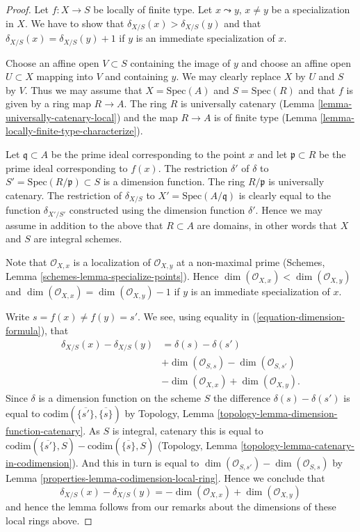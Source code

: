 \begin{proof}
Let $f : X \to S$ be locally of finite type.
Let $x \leadsto y$, $x \not = y$ be a specialization in $X$.
We have to show that $\delta_{X/S}(x) > \delta_{X/S}(y)$ and
that $\delta_{X/S}(x) = \delta_{X/S}(y) + 1$ if $y$ is an
immediate specialization of $x$.

\medskip\noindent
Choose an affine open $V \subset S$ containing the image of
$y$ and choose an affine open $U \subset X$ mapping into $V$
and containing $y$. We may clearly replace $X$ by $U$ and
$S$ by $V$. Thus we may assume that $X = \text{Spec}(A)$
and $S = \text{Spec}(R)$ and that $f$ is given by a ring
map $R \to A$. The ring $R$ is universally catenary
(Lemma \ref{lemma-universally-catenary-local})
and the map $R \to A$ is of finite type
(Lemma \ref{lemma-locally-finite-type-characterize}).

\medskip\noindent
Let $\mathfrak q \subset A$ be the prime ideal corresponding
to the point $x$ and let $\mathfrak p \subset R$ be the prime
ideal corresponding to $f(x)$. The restriction $\delta'$ of $\delta$
to $S' = \text{Spec}(R/\mathfrak p) \subset S$ is a dimension
function. The ring $R/\mathfrak p$ is universally catenary.
The restriction of $\delta_{X/S}$ to $X' = \text{Spec}(A/\mathfrak q)$
is clearly equal to the function $\delta_{X'/S'}$ constructed
using the dimension function $\delta'$. Hence we may assume
in addition to the above that $R \subset A$ are domains, in
other words that $X$ and $S$ are integral schemes.

\medskip\noindent
Note that $\mathcal{O}_{X, x}$ is a localization of
$\mathcal{O}_{X, y}$ at a non-maximal prime
(Schemes, Lemma \ref{schemes-lemma-specialize-points}).
Hence $\dim(\mathcal{O}_{X, x}) < \dim(\mathcal{O}_{X, y})$
and $\dim(\mathcal{O}_{X, x}) = \dim(\mathcal{O}_{X, y}) - 1$
if $y$ is an immediate specialization of $x$.

\medskip\noindent
Write $s = f(x) \not = f(y) = s'$. We see, using equality
in (\ref{equation-dimension-formula}), that
\begin{align*}
\delta_{X/S}(x) - \delta_{X/S}(y) & = \delta(s) - \delta(s') \\
& + \dim(\mathcal{O}_{S, s}) - \dim(\mathcal{O}_{S, s'}) \\
& - \dim(\mathcal{O}_{X, x}) + \dim(\mathcal{O}_{X, y}).
\end{align*}
Since $\delta$ is a dimension function on the scheme $S$ the difference
$\delta(s) - \delta(s')$ is equal to
$\text{codim}(\overline{\{s'\}}, \overline{\{s\}})$ by
Topology, Lemma \ref{topology-lemma-dimension-function-catenary}.
As $S$ is integral, catenary this is equal to
$\text{codim}(\overline{\{s'\}}, S) - \text{codim}(\overline{\{s\}}, S)$
(Topology, Lemma \ref{topology-lemma-catenary-in-codimension}).
And this in turn is equal to
$\dim(\mathcal{O}_{S, s'}) - \dim(\mathcal{O}_{S, s})$ by
Lemma \ref{properties-lemma-codimension-local-ring}.
Hence we conclude that
$$
\delta_{X/S}(x) - \delta_{X/S}(y)
=
- \dim(\mathcal{O}_{X, x}) + \dim(\mathcal{O}_{X, y})
$$
and hence the lemma follows from our remarks about the dimensions
of these local rings above.
\end{proof}


